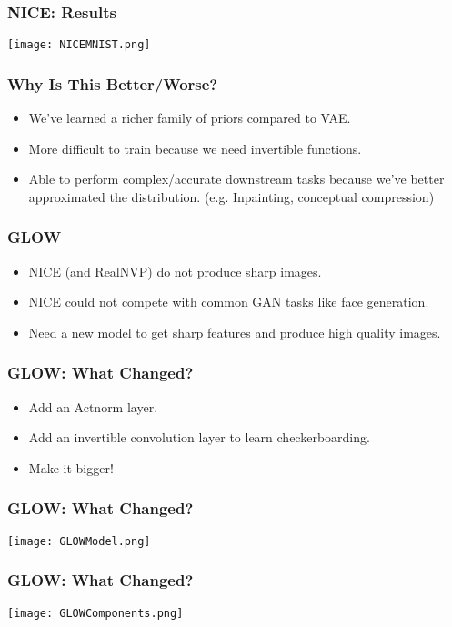 \begin{frame}
    \frametitle{NICE: Results}
    \center\texttt{[image: NICEMNIST.png]}
\end{frame}

\begin{frame}
    \frametitle{Why Is This Better/Worse?}
    \begin{itemize}
        \item We've learned a richer family of priors compared to VAE.
        \item More difficult to train because we need invertible functions.
        \item Able to perform complex/accurate downstream tasks because we've
            better approximated the distribution. (e.g. Inpainting, conceptual
            compression)
    \end{itemize}
\end{frame}

\begin{frame}
    \frametitle{GLOW}
    \begin{itemize}
        \item NICE (and RealNVP) do not produce sharp images.
        \item NICE could not compete with common GAN tasks like face generation.
        \item Need a new model to get sharp features and produce high quality
            images. 
    \end{itemize}
\end{frame}

\begin{frame}
    \frametitle{GLOW: What Changed?}
    \begin{itemize}
        \item Add an Actnorm layer.
        \item Add an invertible convolution layer to learn checkerboarding.
        \item Make it bigger!
    \end{itemize}
\end{frame}

\begin{frame}
    \frametitle{GLOW: What Changed?}
    \center\texttt{[image: GLOWModel.png]}
\end{frame}

\begin{frame}
    \frametitle{GLOW: What Changed?}
    \center\texttt{[image: GLOWComponents.png]}
\end{frame}

